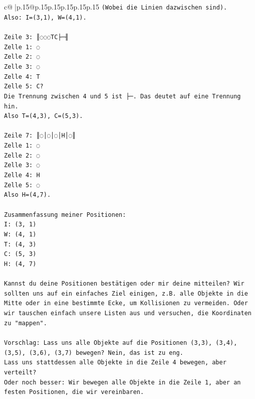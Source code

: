 \documentclass{article}
\begin{document}
{\begin{supertabular}{c@{$\;$}|p{.15\linewidth}@{}p{.15\linewidth}p{.15\linewidth}p{.15\linewidth}p{.15\linewidth}p{.15\linewidth}}
{{{\texttt{(Wobei die Linien dazwischen sind).} \\
\texttt{Also: I=(3,1), W=(4,1).} \\
\\ 
\texttt{Zeile 3: ║◌◌◌TC├─╢} \\
\texttt{Zelle 1: ◌} \\
\texttt{Zelle 2: ◌} \\
\texttt{Zelle 3: ◌} \\
\texttt{Zelle 4: T} \\
\texttt{Zelle 5: C?} \\
\texttt{Die Trennung zwischen 4 und 5 ist ├─. Das deutet auf eine Trennung hin.} \\
\texttt{Also T=(4,3), C=(5,3).} \\
\\ 
\texttt{Zeile 7: ║◌│◌│◌│H│◌║} \\
\texttt{Zelle 1: ◌} \\
\texttt{Zelle 2: ◌} \\
\texttt{Zelle 3: ◌} \\
\texttt{Zelle 4: H} \\
\texttt{Zelle 5: ◌} \\
\texttt{Also H=(4,7).} \\
\\ 
\texttt{Zusammenfassung meiner Positionen:} \\
\texttt{I: (3, 1)} \\
\texttt{W: (4, 1)} \\
\texttt{T: (4, 3)} \\
\texttt{C: (5, 3)} \\
\texttt{H: (4, 7)} \\
\\ 
\texttt{Kannst du deine Positionen bestätigen oder mir deine mitteilen? Wir sollten uns auf ein einfaches Ziel einigen, z.B. alle Objekte in die Mitte oder in eine bestimmte Ecke, um Kollisionen zu vermeiden. Oder wir tauschen einfach unsere Listen aus und versuchen, die Koordinaten zu "mappen".} \\
\\ 
\texttt{Vorschlag: Lass uns alle Objekte auf die Positionen (3,3), (3,4), (3,5), (3,6), (3,7) bewegen? Nein, das ist zu eng.} \\
\texttt{Lass uns stattdessen alle Objekte in die Zeile 4 bewegen, aber verteilt?} \\
\texttt{Oder noch besser: Wir bewegen alle Objekte in die Zeile 1, aber an festen Positionen, die wir vereinbaren.} \\
}}}
\end{supertabular}}
\end{document}

